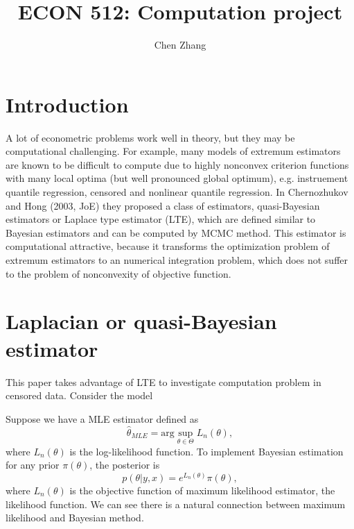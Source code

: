 \documentclass[12pt]{article}
\theoremstyle{plain} \newtheorem{theorem}{Theorem}
\theoremstyle{definition} \newtheorem{definition}{Definition}
\begin{document}
\title{ECON 512: Computation project}
\author{Chen Zhang}
\maketitle

\section{Introduction}

\label{intro}

A lot of econometric problems work well in theory, but they may be
computational challenging. For example, many models of extremum
estimators are known to be difficult to compute due to highly
nonconvex criterion functions with many local optima (but well
pronounced global optimum), e.g. instruement quantile regression,
censored and nonlinear quantile regression. In Chernozhukov and Hong
(2003, JoE) they proposed a class of estimators, quasi-Bayesian
estimators or Laplace type estimator (LTE), which are defined similar
to Bayesian estimators and can be computed by MCMC method. This
estimator is computational attractive, because it transforms the
optimization problem of extremum estimators to an numerical
integration problem, which does not suffer to the problem of
nonconvexity of objective function.

\section{Laplacian or quasi-Bayesian estimator}
This paper takes advantage of LTE to investigate computation problem
in censored data. Consider the model

Suppose we have a MLE estimator defined as
\begin{equation*}
    \hat{\theta}_{MLE} = \mathrm{arg}\sup_{\theta\in\Theta}L_n(\theta),
\end{equation*}
where $L_n(\theta)$ is the log-likelihood function.  To implement
Bayesian estimation for any prior $\pi(\theta)$, the posterior is
\begin{equation*}
    p(\theta |y,x)  =  e^{L_n(\theta)}\pi(\theta),
\end{equation*}
where $L_n(\theta)$ is the objective function of maximum likelihood
estimator, the likelihood function. We can see there is a natural
connection between maximum likelihood and Bayesian method.
\end{document}
